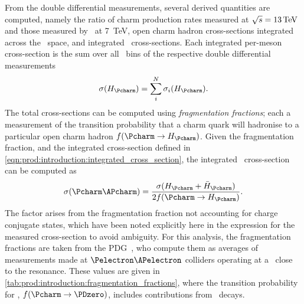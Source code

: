 From the double differential measurements, several derived quantities are 
computed, namely the ratio of charm production rates measured at $\sqrts = 
\SI{13}{\TeV}$ and those measured by \lhcb\ at \SI{7}{\TeV}, open charm hadron 
cross-sections integrated across the \pTy\ space, and integrated \ccbar\ 
cross-sections.
Each integrated per-meson cross-section is the sum over all \pTy\ bins of the 
respective double differential measurements
\begin{equation}
  \xsec{(\PHc)} =
    \sum_{i}^{N} \xsec_{i}(\PHc).
  \label{eqn:prod:introduction:integrated_cross_section}
\end{equation}
The total \ccbar cross-sections can be computed using \emph{fragmentation 
  fractions}; each a measurement of the transition probability that a charm 
quark will hadronise to a particular open charm hadron $f(\cToHc)$.
Given the fragmentation fraction, and the integrated cross-section defined in 
\cref{eqn:prod:introduction:integrated_cross_section}, the integrated \ccbar\ 
cross-section can be computed as
\begin{equation}
  \xsec{(\ccbar)} = \frac{\xsec(\PHc + \APHc)}{2f(\cToHc)}.
  \label{eqn:prod:introduction:ccbar_cross_section}
\end{equation}
The factor \sfrac{1}{2} arises from the fragmentation fraction not accounting 
for charge conjugate states, which have been noted explicitly here in the 
expression for the measured cross-section to avoid ambiguity.
For this analysis, the fragmentation fractions are taken from the 
\ac{PDG}~\cite{PDG2008}, who compute them as averages of measurements made at 
$\Pelectron\APelectron$ colliders operating at a \sqrts\ close to the 
\PUpsilonFourS resonance.
These values are given in \cref{tab:prod:introduction:fragmentation_fractions}, 
where the transition probability for \PDzero, $f(\decay{\Pcharm}{\PDzero})$, 
includes contributions from \DstToDzpi\ decays.

\begin{table}
  \caption[Charm hadron fragmentation fractions]{%
    Charm hadron fragmentation fractions~\cite{PDG2008}.
    Here, \PHc\ does not include the charge conjugate state.
  }
  \label{tab:prod:introduction:fragmentation_fractions}
  \centering
  
\end{table}

